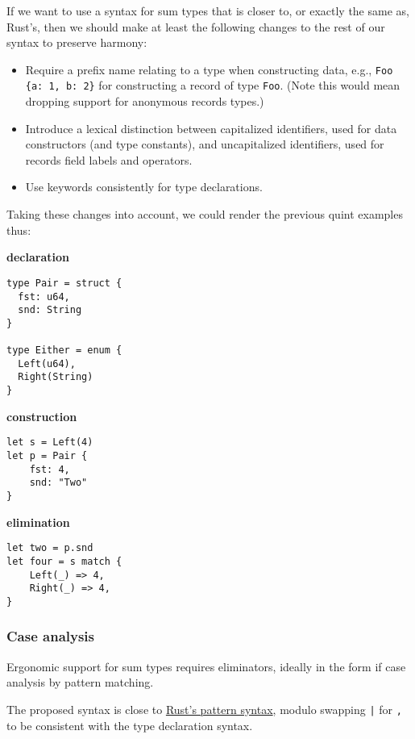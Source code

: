 \documentclass[11pt]{article}
\begin{document}
\begin{enumerate}
If we want to use a syntax for sum types that is closer to, or exactly the same
as, Rust's, then we should make at least the following changes to the rest of
our syntax to preserve harmony:

\begin{itemize}
\item Require a prefix name relating to a type when constructing data, e.g., \texttt{Foo
  \{a: 1, b: 2\}} for constructing a record of type \texttt{Foo}. (Note this would mean
dropping support for anonymous records types.)
\item Introduce a lexical distinction between capitalized identifiers, used for
data constructors (and type constants), and uncapitalized identifiers, used
for records field labels and operators.
\item Use keywords consistently for type declarations.
\end{itemize}

Taking these changes into account, we could render the previous quint examples
thus:

\textbf{declaration}

\begin{verbatim}
type Pair = struct {
  fst: u64,
  snd: String
}

type Either = enum {
  Left(u64),
  Right(String)
}
\end{verbatim}

\textbf{construction}

\begin{verbatim}
let s = Left(4)
let p = Pair {
    fst: 4,
    snd: "Two"
}
\end{verbatim}

\textbf{elimination}

\begin{verbatim}
let two = p.snd
let four = s match {
    Left(_) => 4,
    Right(_) => 4,
}
\end{verbatim}
\end{enumerate}


\subsubsection{Case analysis}
\label{sec:org1404ef7}
Ergonomic support for sum types requires eliminators, ideally in the
form if case analysis by pattern matching.

The proposed syntax is close to \href{https://doc.rust-lang.org/book/ch18-03-pattern-syntax.html\#matching-literals}{Rust's pattern syntax}, modulo swapping \texttt{|}
for \texttt{,} to be consistent with the type declaration syntax.
\end{document}
